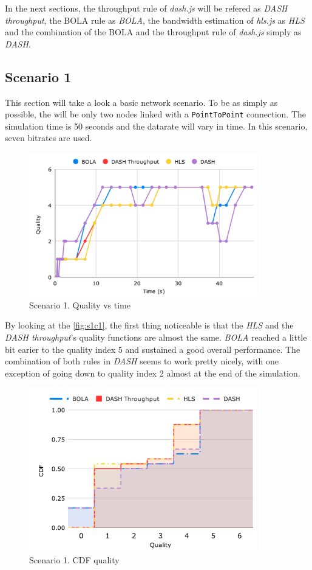 In the next sections, the throughput rule of \textit{dash.js} will be refered as \textit{DASH throughput},
the BOLA rule as \textit{BOLA}, the bandwidth estimation of \textit{hls.js} as \textit{HLS} and the combination
of the BOLA and the throughput rule of \textit{dash.js} simply as \textit{DASH}.

\subsection{Scenario 1}
This section will take a look a basic network scenario. To be as simply as possible, the will be 
only two nodes linked with a \texttt{PointToPoint} connection. The simulation time is 50 seconds 
and the datarate will vary in time. In this scenario, seven bitrates are used.

\begin{figure}[h]
    \centering
    \includegraphics[width=0.9\textwidth]{img/s1c1.pdf}
    \caption{Scenario 1. Quality vs time}
    \label{fig:s1c1}
\end{figure}

By looking at the \autoref{fig:s1c1}, the first thing noticeable is that the \textit{HLS} and the \textit{DASH throughput}'s
quality functions are almost the same. \textit{BOLA} reached a little bit earier to the quality index 5 and 
sustained a good overall performance.
The combination of both rules in \textit{DASH} seems to work pretty nicely, with one exception of going
down to quality index 2 almost at the end of the simulation. 

\begin{figure}[h]
    \centering
    \includegraphics[width=0.9\textwidth]{img/s1c2.pdf}
    \caption{Scenario 1. CDF quality}
    \label{fig:s1c2}
\end{figure}


